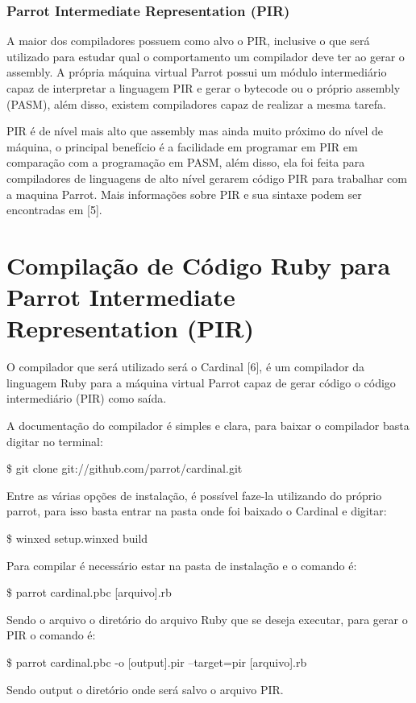 \documentclass[12pt,a4paper,twoside]{report}
\begin{document}
\subsection{Parrot Intermediate Representation (PIR)}
A maior dos compiladores possuem como alvo o PIR, inclusive o que será
utilizado para estudar qual o comportamento um compilador deve ter ao
gerar o assembly.
A própria máquina virtual Parrot possui um módulo intermediário capaz
de interpretar a linguagem PIR e gerar o bytecode ou o próprio
assembly (PASM), além disso, existem compiladores capaz de realizar a
mesma tarefa.

PIR é de nível mais alto que assembly mas ainda muito próximo do nível
de máquina, o principal benefício é a facilidade em programar em PIR
em comparação com a programação em PASM, além disso, ela foi feita
para compiladores de linguagens de alto nível gerarem código PIR para
trabalhar com a maquina Parrot.
Mais informações sobre PIR e sua sintaxe podem ser encontradas em [5].

\chapter{Compilação de Código Ruby para Parrot Intermediate Representation (PIR)}
O compilador que será utilizado será o Cardinal [6], é um compilador
da linguagem Ruby para a máquina virtual Parrot capaz de gerar código
o código intermediário (PIR) como saída.

A documentação do compilador é simples e clara, para baixar o
compilador basta digitar no terminal:
\begin{terminal}
\$ git clone git://github.com/parrot/cardinal.git
\end{terminal}
Entre as várias opções de instalação, é possível faze-la utilizando do
próprio parrot, para isso basta entrar na pasta onde foi baixado o
Cardinal e digitar:
\begin{terminal}
\$ winxed setup.winxed build
\end{terminal}

Para compilar é necessário estar na pasta de instalação e o comando é:
\begin{terminal}
\$ parrot cardinal.pbc [arquivo].rb
\end{terminal}
Sendo o arquivo o diretório do arquivo Ruby que se deseja executar,
para gerar o PIR o comando é:
\begin{terminal}
\$ parrot cardinal.pbc -o [output].pir --target=pir [arquivo].rb
\end{terminal}
Sendo output o diretório onde será salvo o arquivo PIR.
\end{document}
